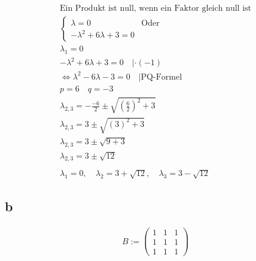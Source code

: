 \begin{align*}
    \text{Ein Produkt ist null, wenn ein Faktor gleich null ist} \\
    \begin{cases}
        \lambda = 0 & \text{Oder} \\
        -\lambda^2 + 6\lambda + 3 = 0
    \end{cases} \\
    \lambda_1 = 0 \\
    -\lambda^2 + 6 \lambda + 3 = 0 \quad |\cdot (-1) \\
    \Leftrightarrow \lambda^2 - 6 \lambda - 3 = 0 \quad | \text{PQ-Formel} \\
    p = 6 \quad q = -3 \\
    \lambda_{2,3} = -\frac{-6}{2} \pm \sqrt{\left(\frac{6}{2}\right)^2 + 3} \\
    \lambda_{2,3}= 3 \pm \sqrt{\left(3\right)^2 + 3} \\
    \lambda_{2,3}= 3 \pm \sqrt{9 + 3} \\
    \lambda_{2,3}= 3 \pm \sqrt{12} \\\\
    \lambda_1 = 0, \quad \lambda_2 = 3 + \sqrt{12}, \quad \lambda_3 = 3 - \sqrt{12}
\end{align*}

\subsection{b}

\begin{align*}
    B := \begin{pmatrix}
        1 & 1 & 1 \\
        1 & 1 & 1 \\
        1 & 1 & 1
    \end{pmatrix}
\end{align*}

